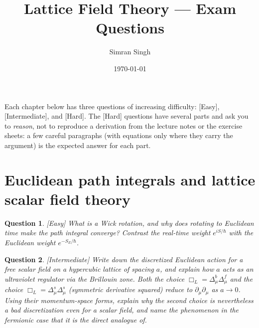 \documentclass[11pt]{article}
\title{Lattice Field Theory — Exam Questions}
\author{Simran Singh}
\date{\today}
\newcommand{\diff}[1]{\textcolor{blue!60!black}{\footnotesize\textsf{[#1]}}\quad}
\newtheorem{question}{Question}
\begin{document}
\maketitle

\noindent Each chapter below has three questions of increasing difficulty:
\textcolor{blue!60!black}{\textsf{[Easy]}}, \textcolor{blue!60!black}{\textsf{[Intermediate]}}, and \textcolor{blue!60!black}{\textsf{[Hard]}}.
The \textcolor{blue!60!black}{\textsf{[Hard]}} questions have several parts and ask you to \emph{reason}, not to reproduce a
derivation from the lecture notes or the exercise sheets: a few careful paragraphs (with equations only where they
carry the argument) is the expected answer for each part.

\section{Euclidean path integrals and lattice scalar field theory}

\begin{question}
\diff{Easy} What is a Wick rotation, and why does rotating to Euclidean time make the path integral converge? Contrast the real-time weight $e^{iS/\hbar}$ with the Euclidean weight $e^{-S_E/\hbar}$.
\end{question}

\begin{question}
\diff{Intermediate} Write down the discretized Euclidean action for a free scalar field on a hypercubic lattice of spacing $a$, and explain how $a$ acts as an ultraviolet regulator via the Brillouin zone.
Both the choice $\Box_L = \Delta^b_\mu\Delta^f_\mu$ and the choice $\Box_L = \Delta^s_\mu\Delta^s_\mu$ (symmetric derivative squared) reduce to $\partial_\mu\partial_\mu$ as $a\to 0$. Using their momentum-space forms, explain why the second choice is nevertheless a bad discretization even for a \emph{scalar} field, and name the phenomenon in the fermionic case that it is the direct analogue of.
\end{question}
\end{document}
